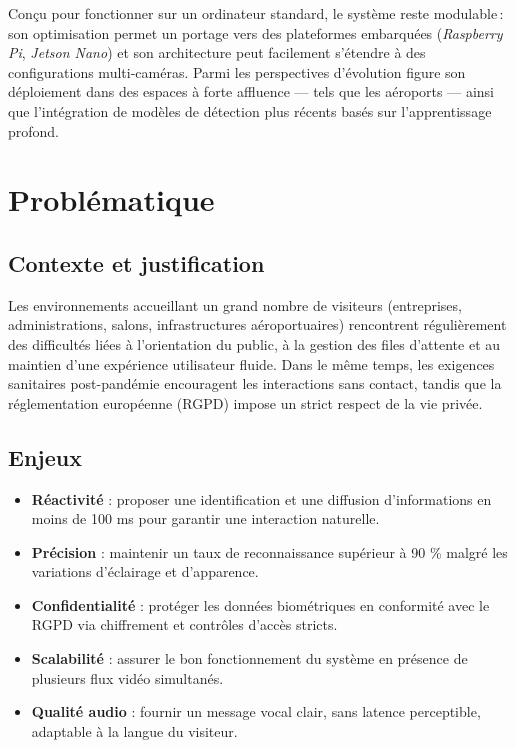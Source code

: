 \documentclass[12pt,a4paper]{article}
\begin{document}
Conçu pour fonctionner sur un ordinateur standard, le système reste modulable\,: son optimisation permet un portage vers des plateformes embarquées (\textit{Raspberry Pi}, \textit{Jetson Nano}) et son architecture peut facilement s’étendre à des configurations multi-caméras. Parmi les perspectives d’évolution figure son déploiement dans des espaces à forte affluence — tels que les aéroports — ainsi que l’intégration de modèles de détection plus récents basés sur l’apprentissage profond.

\newpage
\section{Problématique}

\subsection{Contexte et justification}
Les environnements accueillant un grand nombre de visiteurs (entreprises, administrations, salons, infrastructures aéroportuaires) rencontrent régulièrement des difficultés liées à l’orientation du public, à la gestion des files d’attente et au maintien d’une expérience utilisateur fluide. Dans le même temps, les exigences sanitaires post-pandémie encouragent les interactions sans contact, tandis que la réglementation européenne (RGPD) impose un strict respect de la vie privée.

\subsection{Enjeux}
\begin{itemize}
  \item \textbf{Réactivité} : proposer une identification et une diffusion d’informations en moins de 100 ms pour garantir une interaction naturelle.
  \item \textbf{Précision} : maintenir un taux de reconnaissance supérieur à 90 \% malgré les variations d’éclairage et d’apparence.
  \item \textbf{Confidentialité} : protéger les données biométriques en conformité avec le RGPD via chiffrement et contrôles d’accès stricts.
  \item \textbf{Scalabilité} : assurer le bon fonctionnement du système en présence de plusieurs flux vidéo simultanés.
  \item \textbf{Qualité audio} : fournir un message vocal clair, sans latence perceptible, adaptable à la langue du visiteur.
\end{itemize}
\end{document}
